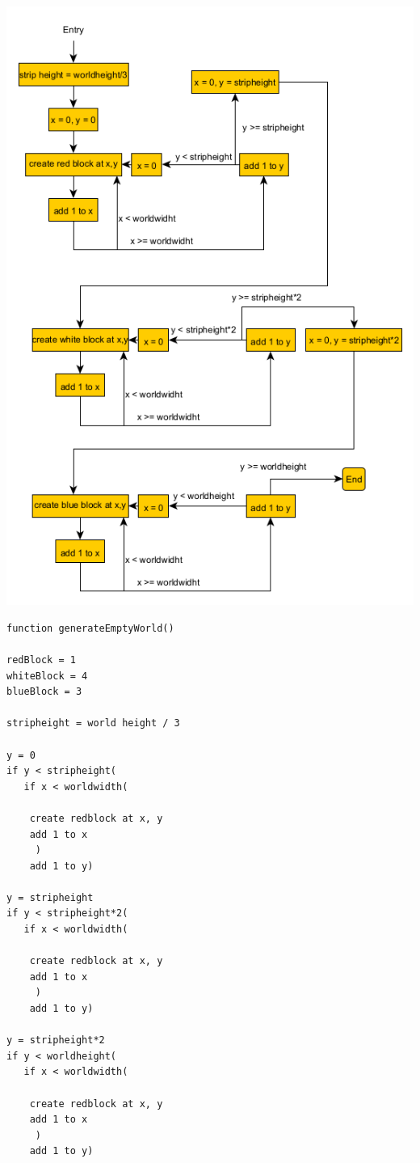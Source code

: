 {\includegraphics[width=\textwidth]{../flowchart/generateEmptyWorld.png}}
\begin{lstlisting}
function generateEmptyWorld()

redBlock = 1
whiteBlock = 4
blueBlock = 3

stripheight = world height / 3

y = 0
if y < stripheight(
   if x < worldwidth(
        
	create redblock at x, y
	add 1 to x
     )
    add 1 to y)

y = stripheight
if y < stripheight*2(
   if x < worldwidth(
        
	create redblock at x, y
	add 1 to x
     )
    add 1 to y)

y = stripheight*2
if y < worldheight(
   if x < worldwidth(
        
	create redblock at x, y
	add 1 to x
     )
    add 1 to y)
\end{lstlisting}
